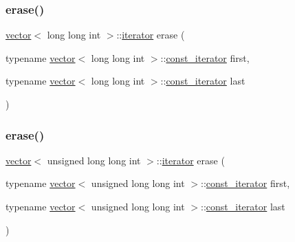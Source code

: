 \subsubsection{\texorpdfstring{erase()}{erase()}\hspace{0.1cm}{\footnotesize\ttfamily [24/28]}}
{\footnotesize\ttfamily \mbox{\hyperlink{classvector}{vector}}$<$ long long int $>$\+::\mbox{\hyperlink{classvector_a35c955cacac6aacaa1e82874b1628865}{iterator}} erase (\begin{DoxyParamCaption}\item[{typename \mbox{\hyperlink{classvector}{vector}}$<$ long long int $>$\+::\mbox{\hyperlink{classvector_a2fc97dce62b7053449cc868607540dba}{const\+\_\+iterator}}}]{first,  }\item[{typename \mbox{\hyperlink{classvector}{vector}}$<$ long long int $>$\+::\mbox{\hyperlink{classvector_a2fc97dce62b7053449cc868607540dba}{const\+\_\+iterator}}}]{last }\end{DoxyParamCaption})}

\mbox{\label{classvector_a12ff8acbe48298ba7ed04be41cf6ca5f}} 
\subsubsection{\texorpdfstring{erase()}{erase()}\hspace{0.1cm}{\footnotesize\ttfamily [25/28]}}
{\footnotesize\ttfamily \mbox{\hyperlink{classvector}{vector}}$<$ unsigned long long int $>$\+::\mbox{\hyperlink{classvector_a35c955cacac6aacaa1e82874b1628865}{iterator}} erase (\begin{DoxyParamCaption}\item[{typename \mbox{\hyperlink{classvector}{vector}}$<$ unsigned long long int $>$\+::\mbox{\hyperlink{classvector_a2fc97dce62b7053449cc868607540dba}{const\+\_\+iterator}}}]{first,  }\item[{typename \mbox{\hyperlink{classvector}{vector}}$<$ unsigned long long int $>$\+::\mbox{\hyperlink{classvector_a2fc97dce62b7053449cc868607540dba}{const\+\_\+iterator}}}]{last }\end{DoxyParamCaption})}

\mbox{\label{classvector_a963ac95d7d6ee8c509f34f236fa17996}} 
